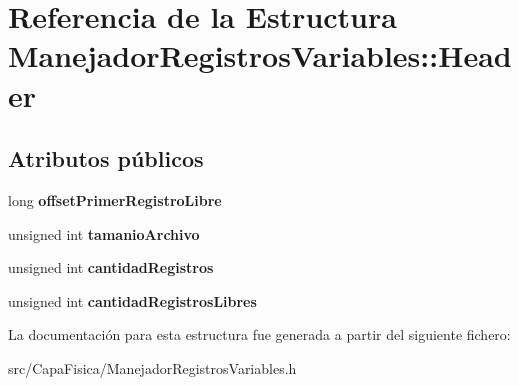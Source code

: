 \hypertarget{struct_manejador_registros_variables_1_1_header}{\section{\-Referencia de la \-Estructura \-Manejador\-Registros\-Variables\-:\-:\-Header}
\label{struct_manejador_registros_variables_1_1_header}
}
\subsection*{\-Atributos públicos}
\begin{DoxyCompactItemize}
\item 
\hypertarget{struct_manejador_registros_variables_1_1_header_a4c06a41168a80d80cbea9652ff8f48d4}{long {\bfseries offset\-Primer\-Registro\-Libre}}\label{struct_manejador_registros_variables_1_1_header_a4c06a41168a80d80cbea9652ff8f48d4}

\item 
\hypertarget{struct_manejador_registros_variables_1_1_header_ab0decc7050d28264c9f329f3ff7f558f}{unsigned int {\bfseries tamanio\-Archivo}}\label{struct_manejador_registros_variables_1_1_header_ab0decc7050d28264c9f329f3ff7f558f}

\item 
\hypertarget{struct_manejador_registros_variables_1_1_header_aa0e57ecbbc81d44e414b1e6a27bdecc1}{unsigned int {\bfseries cantidad\-Registros}}\label{struct_manejador_registros_variables_1_1_header_aa0e57ecbbc81d44e414b1e6a27bdecc1}

\item 
\hypertarget{struct_manejador_registros_variables_1_1_header_a5429b12e88270360eccbeaedefb298eb}{unsigned int {\bfseries cantidad\-Registros\-Libres}}\label{struct_manejador_registros_variables_1_1_header_a5429b12e88270360eccbeaedefb298eb}

\end{DoxyCompactItemize}


\-La documentación para esta estructura fue generada a partir del siguiente fichero\-:\begin{DoxyCompactItemize}
\item 
src/\-Capa\-Fisica/\-Manejador\-Registros\-Variables.\-h\end{DoxyCompactItemize}
